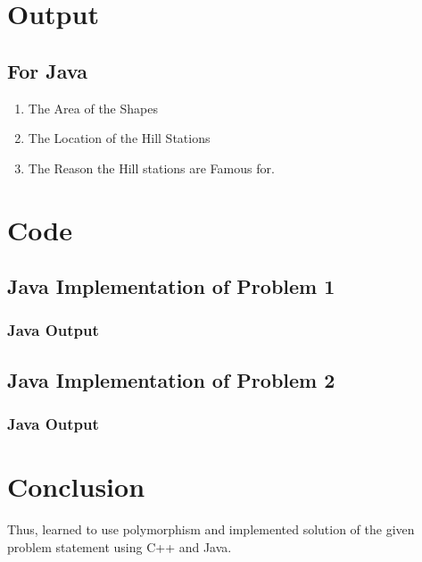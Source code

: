 \documentclass[11pt]{article}
\begin{document}
\section{Output}
\subsection*{For Java}
\begin{enumerate}
	\item The Area of the Shapes
	\item The Location of the Hill Stations
	\item The Reason the Hill stations are Famous for.
\end{enumerate}


\section{Code}

\subsection{Java Implementation of Problem 1}



\subsubsection{Java Output}


\subsection{Java Implementation of Problem 2}



\subsubsection{Java Output}



\section{Conclusion}
Thus, learned to use polymorphism and implemented solution of the given problem statement using C++ and Java.
\pagebreak
\end{document}
